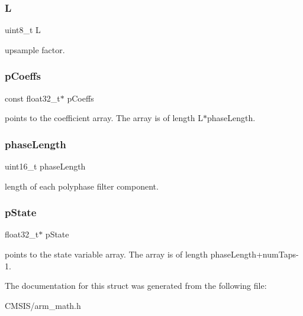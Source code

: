 \subsubsection{\texorpdfstring{L}{L}}
{\footnotesize\ttfamily uint8\+\_\+t L}

upsample factor. \mbox{\label{structarm__fir__interpolate__instance__f32_a39230f04a29d8321948e339633780442}} 
\subsubsection{\texorpdfstring{pCoeffs}{pCoeffs}}
{\footnotesize\ttfamily const float32\+\_\+t$\ast$ p\+Coeffs}

points to the coefficient array. The array is of length L$\ast$phase\+Length. \mbox{\label{structarm__fir__interpolate__instance__f32_a8f92bb07e0812f94679438cdf412b26a}} 
\subsubsection{\texorpdfstring{phaseLength}{phaseLength}}
{\footnotesize\ttfamily uint16\+\_\+t phase\+Length}

length of each polyphase filter component. \mbox{\label{structarm__fir__interpolate__instance__f32_a335c87e6fdc4b96601d95a5de8b9c463}} 
\subsubsection{\texorpdfstring{pState}{pState}}
{\footnotesize\ttfamily float32\+\_\+t$\ast$ p\+State}

points to the state variable array. The array is of length phase\+Length+num\+Taps-\/1. 

The documentation for this struct was generated from the following file\+:\begin{DoxyCompactItemize}
\item 
C\+M\+S\+I\+S/arm\+\_\+math.\+h\end{DoxyCompactItemize}
